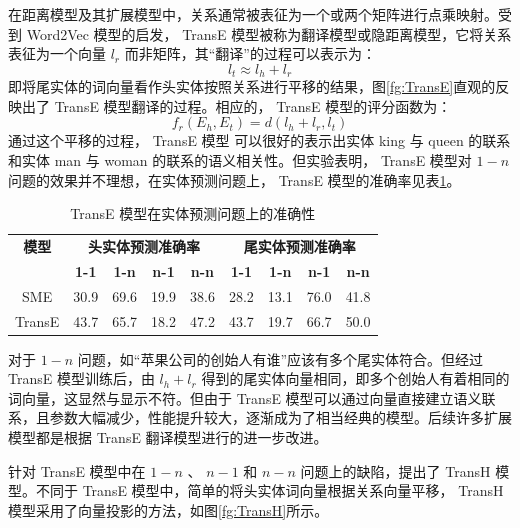\documentclass{llncs}
\begin{document}
在距离模型及其扩展模型中，关系通常被表征为一个或两个矩阵进行点乘映射。受到 Word2Vec 模型\cite{DBLP:conf/nips/MikolovSCCD13,DBLP:journals/corr/abs-1301-3781}的启发， TransE 模型\cite{DBLP:conf/nips/BordesUGWY13}被称为翻译模型或隐距离模型，它将关系表征为一个向量 $l_r$ 而非矩阵，其“翻译”的过程可以表示为：
\begin{displaymath}
l_t\approx l_h+l_r
\end{displaymath}
即将尾实体的词向量看作头实体按照关系进行平移的结果，图\ref{fg:TransE}直观的反映出了 TransE 模型翻译的过程。相应的， TransE 模型的评分函数为：
\begin{displaymath}
f_r(E_h,E_t)=d(l_h+l_r,l_t)
\end{displaymath}
通过这个平移的过程， TransE 模型 可以很好的表示出实体 king 与 queen 的联系和实体 man 与 woman 的联系的语义相关性。但实验\cite{DBLP:conf/nips/BordesUGWY13}表明， TransE 模型对 $1-n$ 问题的效果并不理想，在实体预测问题上， TransE 模型的准确率见表\ref{tb:TransE}。

\begin{table}
	\centering
	\caption{ TransE 模型在实体预测问题上的准确性}
	\label{tb:TransE}
	\begin{threeparttable}
		\begin{tabular}{ccccccccc}
			\hline
			\textbf{模型} & \multicolumn{4}{c}{\textbf{头实体预测准确率}} & \multicolumn{4}{c}{\textbf{尾实体预测准确率}} \\
			\textbf{} & \textbf{1-1} & \textbf{1-n} & \textbf{n-1} & \textbf{n-n} & \textbf{1-1} & \textbf{1-n} & \textbf{n-1} & \textbf{n-n} \\ \hline
			SME & 30.9 & 69.6 & 19.9 & 38.6 & 28.2 & 13.1 & 76.0 & 41.8\\
			TransE & 43.7 & 65.7 & 18.2 & 47.2 & 43.7 & 19.7 & 66.7 & 50.0 \\ \hline
		\end{tabular}
	\end{threeparttable}
\end{table}

对于 $1-n$ 问题，如“苹果公司的创始人有谁”应该有多个尾实体符合。但经过 TransE 模型训练后，由 $l_h+l_r$ 得到的尾实体向量相同，即多个创始人有着相同的词向量，这显然与显示不符。但由于 TransE 模型可以通过向量直接建立语义联系，且参数大幅减少，性能提升较大，逐渐成为了相当经典的模型。后续许多扩展模型都是根据 TransE 翻译模型进行的进一步改进。

针对 TransE 模型中在 $1-n$ 、 $n-1$ 和 $n-n$ 问题上的缺陷，提出了 TransH 模型\cite{DBLP:conf/aaai/WangZFC14}。不同于 TransE 模型中，简单的将头实体词向量根据关系向量平移， TransH 模型采用了向量投影的方法，如图\ref{fg:TransH}所示。
\end{document}
